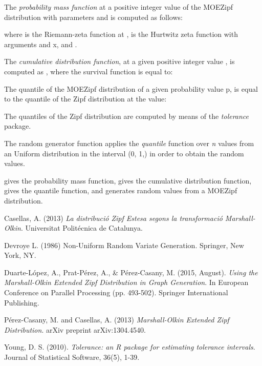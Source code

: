 \documentclass[letterpaper]{book}
\begin{document}
\begin{Details}\relax
The \emph{probability mass function} at a positive integer value  of the MOEZipf distribution with
parameters \eqn{\alpha}{} and \eqn{\beta}{} is computed as follows:


where \eqn{\zeta(\alpha)}{} is the Riemann-zeta function at \eqn{\alpha}{}, 
is the Hurtwitz zeta function with arguments \eqn{\alpha}{} and x, and .

The \emph{cumulative distribution function}, at a given positive integer value ,
is computed as , where the survival function  is equal to:

The quantile of the MOEZipf\eqn{(\alpha, \beta)}{} distribution of a given probability value p,
is equal to the quantile of the Zipf\eqn{(\alpha)}{} distribution at the value:

The quantiles of the Zipf\eqn{(\alpha)}{} distribution are computed by means of the \emph{tolerance}
package.

The random generator function applies the \emph{quantile} function over \emph{n} values
from an Uniform distribution in the interval (0, 1,) in order to obtain
the random values.
\end{Details}
%
\begin{Value}

 gives the probability mass function,
 gives the cumulative distribution function,
 gives the quantile function, and
 generates random values from a MOEZipf distribution.
\end{Value}
%
\begin{References}\relax

Casellas, A. (2013) \emph{La distribució Zipf Estesa segons la transformació Marshall-Olkin}. Universitat Politécnica de Catalunya.

Devroye L. (1986) Non-Uniform Random Variate Generation. Springer, New York, NY.

Duarte-López, A., Prat-Pérez, A., \& Pérez-Casany, M. (2015, August). \emph{Using the Marshall-Olkin Extended Zipf Distribution in Graph Generation}. In European Conference on Parallel Processing (pp. 493-502). Springer International Publishing.

Pérez-Casany, M. and Casellas, A. (2013) \emph{Marshall-Olkin Extended Zipf Distribution}. arXiv preprint arXiv:1304.4540.

Young, D. S. (2010). \emph{Tolerance: an R package for estimating tolerance intervals}. Journal of Statistical Software, 36(5), 1-39.

\end{References}
\end{document}
